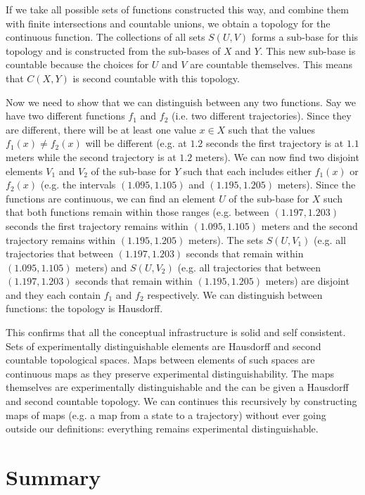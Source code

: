 \documentclass[11pt,letterpaper,fleqn]{memoir} %
\begin{document}
If we take all possible sets of functions constructed this way, and combine them with finite intersections and countable unions, we obtain a topology for the continuous function. The collections of all sets $S(U,V)$ forms a sub-base for this topology and is constructed from the sub-bases of $X$ and $Y$. This new sub-base is countable because the choices for $U$ and $V$ are countable themselves. This means that $C(X,Y)$ is second countable with this topology.

Now we need to show that we can distinguish between any two functions. Say we have two different functions $f_1$ and $f_2$ (i.e. two different trajectories). Since they are different, there will be at least one value $x \in X$ such that the values $f_1(x)\neq f_2(x)$ will be different (e.g. at $1.2$ seconds the first trajectory is at $1.1$ meters while the second trajectory is at $1.2$ meters). We can now find two disjoint elements $V_1$ and $V_2$ of the sub-base for $Y$ such that each includes either $f_1(x)$ or $f_2(x)$ (e.g. the intervals $(1.095, 1.105)$ and $(1.195, 1.205)$ meters). Since the functions are continuous, we can find an element $U$ of the sub-base for $X$ such that both functions remain within those ranges (e.g. between $(1.197, 1.203)$ seconds the first trajectory remains within $(1.095, 1.105)$ meters and the second trajectory remains within $(1.195, 1.205)$ meters). The sets $S(U, V_1)$ (e.g. all trajectories that between $(1.197, 1.203)$ seconds that remain within $(1.095, 1.105)$ meters) and $S(U, V_2)$ (e.g. all trajectories that between $(1.197, 1.203)$ seconds that remain within $(1.195, 1.205)$ meters) are disjoint and they each contain $f_1$ and $f_2$ respectively. We can distinguish between functions: the topology is Hausdorff.

This confirms that all the conceptual infrastructure is solid and self consistent. Sets of experimentally distinguishable elements are Hausdorff and second countable topological spaces. Maps between elements of such spaces are continuous maps as they preserve experimental distinguishability. The maps themselves are experimentally distinguishable and the can be given a Hausdorff and second countable topology. We can continues this recursively by constructing maps of maps (e.g. a map from a state to a trajectory) without ever going outside our definitions: everything remains experimental distinguishable.

\section{Summary}
\end{document}
